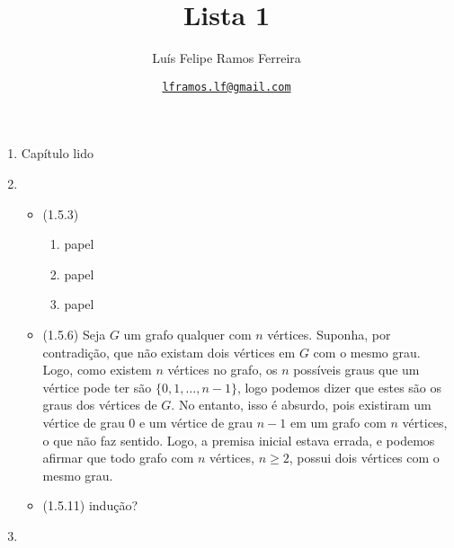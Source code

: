 \documentclass{article}
\title{Lista 1}
\author{Luís Felipe Ramos Ferreira}
\date{\href{mailto:lframos.lf@gmail.com}{\texttt{lframos.lf@gmail.com}}
}
\begin{document}
\maketitle

\begin{enumerate}

	\item Capítulo lido
	\item
	      \begin{itemize}
		      \item (1.5.3)
		            \begin{enumerate}
			            \item papel
			            \item papel
			            \item papel
		            \end{enumerate}
		      \item (1.5.6) Seja \(G\) um grafo qualquer com \(n\) vértices. Suponha, por contradição, que não existam dois vértices em \(G\) com o mesmo grau. Logo, como existem \(n\) vértices no grafo, os \(n\) possíveis graus que um vértice pode ter são \(\{0, 1, \dots, n-1\}\), logo podemos dizer que estes são os graus dos vértices de \(G\). No entanto, isso é absurdo, pois existiram um vértice de grau 0 e um vértice de grau \(n-1\) em um grafo com \(n\) vértices, o que não faz sentido. Logo, a premisa inicial estava errada, e podemos afirmar que todo grafo com \(n\) vértices, \(n \geq 2\), possui dois vértices com o mesmo grau.
		      \item (1.5.11) indução?
	      \end{itemize}
	\item

\end{enumerate}
\end{document}
